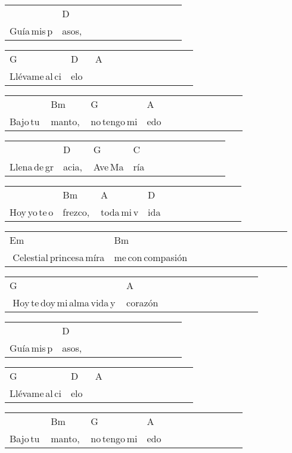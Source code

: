 \begin{multicols}{2}

\noindent
\noindent
\begin{tabular}{llllllllllll}
&D\\
Guía\,mis\,p&asos,
\end{tabular}

\noindent
\begin{tabular}{llllllllllll}
G&D&A\\
Llévame\,al\,ci&elo\,\,&
\end{tabular}

\noindent
\begin{tabular}{llllllllllll}
&Bm&G&A\\
Bajo\,tu\,&manto,\,&no\,tengo\,mi&edo
\end{tabular}

\noindent
\begin{tabular}{llllllllllll}
&D&G&C\\
Llena\,de\,gr&acia,\,&Ave\,Ma&ría
\end{tabular}

\noindent
\begin{tabular}{llllllllllll}
&Bm&A&D\\
Hoy\,yo\,te\,o&frezco,\,&toda\,mi\,v&ida
\end{tabular}


\noindent
\noindent
\begin{tabular}{llllllllllll}
Em&Bm\\
\,\,Celestial\,princesa\,míra&me\,con\,compasión
\end{tabular}

\noindent
\begin{tabular}{llllllllllll}
G&A\\
\,\,Hoy\,te\,doy\,mi\,alma\,vida\,y\,&corazón
\end{tabular}


\noindent
\noindent
\begin{tabular}{llllllllllll}
&D\\
Guía\,mis\,p&asos,
\end{tabular}

\noindent
\begin{tabular}{llllllllllll}
G&D&A\\
Llévame\,al\,ci&elo\,\,&
\end{tabular}

\noindent
\begin{tabular}{llllllllllll}
&Bm&G&A\\
Bajo\,tu\,&manto,\,&no\,tengo\,mi&edo
\end{tabular}


\end{multicols}
